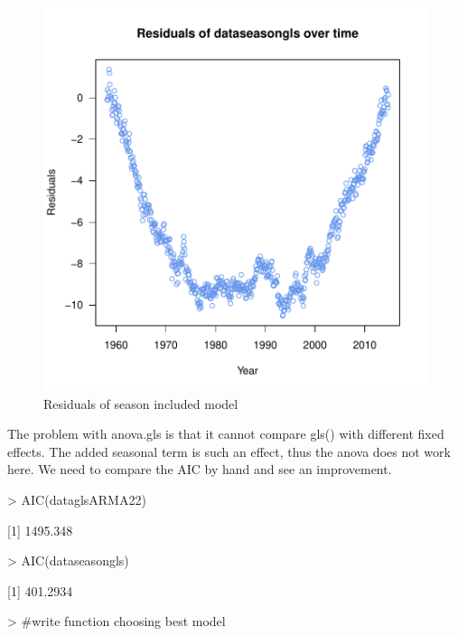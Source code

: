\documentclass[11pt, a4paper]{article} %
\begin{document}
\begin{figure}[H]
\centering
\begin{Schunk}
\end{Schunk}
\includegraphics{alleselena-resseas}
\caption{Residuals of season included model}
\label{resseas}
\end{figure}

The problem with anova.gls is that it cannot compare gls() with different fixed effects. The added seasonal term is such an effect, thus the anova does not work here. We need to compare the AIC by hand and see an improvement. 


\begin{Schunk}
\begin{Sinput}
> AIC(dataglsARMA22)
\end{Sinput}
[1] 1495.348\begin{Sinput}
> AIC(dataseasongls)
\end{Sinput}
[1] 401.2934\begin{Sinput}
> #write function choosing best model 
\end{Sinput}
\end{Schunk}
\end{document}
